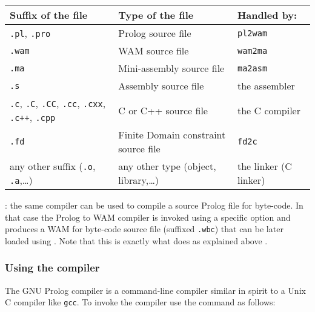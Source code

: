 \begin{tabular}{|l|l|l|}
\hline

Suffix of the file & Type of the file & Handled by: \\

\hline\hline

\texttt{.pl}, \texttt{.pro} & Prolog source file & \texttt{pl2wam} \\

\hline

\texttt{.wam} & WAM source file & \texttt{wam2ma} \\

\hline

\texttt{.ma} & Mini-assembly source file & \texttt{ma2asm} \\

\hline

\texttt{.s} & Assembly source file & the assembler \\

\hline

\texttt{.c}, \texttt{.C}, \texttt{.CC}, \texttt{.cc}, \texttt{.cxx},
\texttt{.c++}, \texttt{.cpp} & C or C++ source file & the C compiler \\

\hline

\texttt{.fd} & Finite Domain constraint source file & \texttt{fd2c} \\

\hline

any other suffix (\texttt{.o}, \texttt{.a},\ldots) & any other type
(object, library,\ldots) & the linker (C linker) \\

\hline
\end{tabular}

: the same compiler can be used to compile a
source Prolog file for byte-code. In that case the Prolog to WAM compiler is
invoked using a specific option and produces a WAM for byte-code source file
(suffixed \texttt{.wbc}) that can be later loaded using 
. Note that this is exactly what 
 does as explained above .

\subsubsection{Using the compiler}
\label{Using-the-compiler}
The GNU Prolog compiler is a command-line compiler similar in spirit to a Unix
C compiler like \texttt{gcc}. To invoke the compiler use the 
command as follows:

